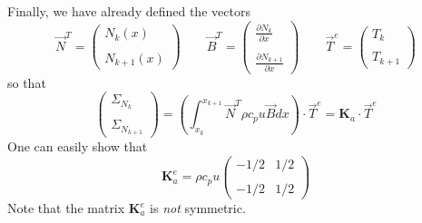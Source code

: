 Finally, we have already defined the vectors 
\[
{\vec N}^T = 
\left(
\begin{array}{c}
N_k(x)  \\ \\  N_{k+1} (x)
\end{array}
\right)
\quad\quad
{\vec B}^T=
\left(
\begin{array}{cc}
 \frac{\partial N_k}{\partial x}   \\ \\
 \frac{\partial N_{k+1}}{\partial x}
\end{array}
\right)
\quad
\quad
{\vec T}^e = 
\left(
\begin{array}{c}
T_k \\ \\ T_{k+1}
\end{array}
\right)
\]
so that 
\[
\left(
\begin{array}{c}
{\Sigma}_{N_k} \\  \\ {\Sigma}_{N_{k+1}}
\end{array}
\right)
=
\left( \int_{x_k}^{x_{k+1}}   {\vec N}^T \rho c_p u {\vec B} dx  \right) \cdot {\vec T}^e
= {\bm K}_a \cdot \vec T^e
\]
One can easily show that 
\[
{\bm K}_a^e=
\rho c_p u
\left(
\begin{array}{cc}
-1/2 & 1/2 \\ \\
-1/2 & 1/2 
\end{array}
\right)
\]
Note that the matrix ${\bm K}_a^e$ is {\sl not} symmetric. 

